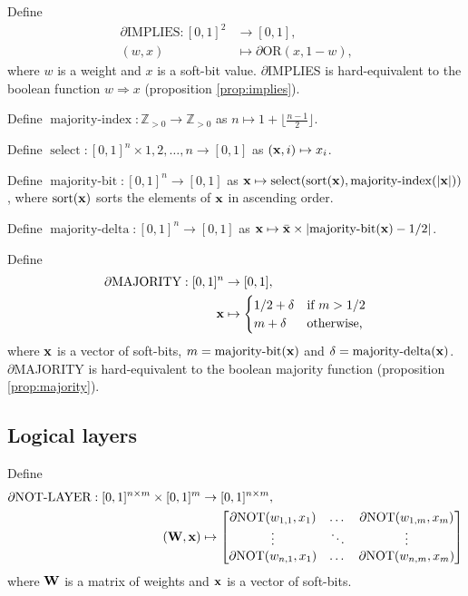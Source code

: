 \documentclass{article} %
\begin{document}
Define
\begin{equation*}
\begin{aligned}
\partial\text{IMPLIES}: [0,1]^{2} &\to [0,1],\\
(w, x) &\mapsto \partial\text{OR}(x, 1-w)\text{,}
\end{aligned}
\end{equation*}
where $w$ is a weight and $x$ is a soft-bit value.
$\partial${IMPLIES} is hard-equivalent to the boolean function $w \Rightarrow x$ (proposition \ref{prop:implies}).

Define $\operatorname{majority-index}: \mathbb{Z}_{>0} \to \mathbb{Z}_{> 0}$ as $n \mapsto 1 + \lfloor \frac{n-1}{2}\rfloor$. 

Define $\operatorname{select}: [0,1]^n \times {1, 2, \ldots, n} \to [0,1]$ as  $({\bf x}, i) \mapsto x_{i}$.

Define $\operatorname{majority-bit}: [0,1]^n \to [0,1]$ as  ${\bf x} \mapsto \operatorname{select}( \operatorname{sort}({\bf x}), \operatorname{majority-index}(\lvert{\bf x}\rvert))$, where $\operatorname{sort}({\bf x})$ sorts the elements of ${\bf x}$ in ascending order.

Define $\operatorname{majority-delta}: [0,1]^n \to [0,1]$ as
${\bf x} \mapsto \bar{\bf x} \times \left| \operatorname{majority-bit}({\bf x}) - 1/2\right|$.

Define
\begin{equation*}
\begin{aligned}
\partial\text{MAJORITY}: [0,1]^{n} &\to [0,1], \\
{\bf x} &\mapsto 
	\begin{cases}
	1/2 + \delta & \text{if } m > 1/2 \\
	m + \delta & \text{otherwise,}
	\end{cases}
\end{aligned}
\end{equation*}
where ${\bf x}$ is a vector of soft-bits, $m = \operatorname{majority-bit}({\bf x})$ and $\delta = \operatorname{majority-delta}({\bf x})$.
$\partial${MAJORITY} is hard-equivalent to the boolean majority function (proposition \ref{prop:majority}).

\subsection{Logical layers}

Define
\begin{equation*}
\begin{aligned}
\partial\text{NOT-LAYER}: [0,1]^{n \times m} \times [0,1]^{m} &\to [0,1]^{n \times m}, \\
({\bf W}, {\bf x}) &\mapsto 
\begin{bmatrix}
\partial\text{NOT}(w_{1,1}, x_{1}) & \dots & \partial\text{NOT}(w_{1,m}, x_{m}) \\
\vdots & \ddots & \vdots \\
\partial\text{NOT}(w_{n,1}, x_{1}) & \dots & \partial\text{NOT}(w_{n,m}, x_{m})
\end{bmatrix}
\end{aligned}
\end{equation*}
where ${\bf W}$ is a matrix of weights and ${\bf x}$ is a vector of soft-bits.
\end{document}
